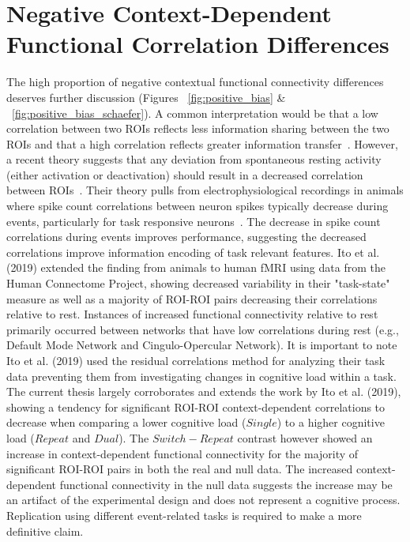 \documentclass[phd,figures,tables,ackpage,abstractpage,publicabstractpage]{uithesis}
\begin{document}
\section{Negative Context-Dependent Functional Correlation Differences}

The high proportion of negative contextual functional connectivity differences deserves
further discussion (Figures ~\ref{fig:positive_bias} \& ~\ref{fig:positive_bias_schaefer}).
A common interpretation would be that a low correlation between two ROIs reflects less information
sharing between the two ROIs and that a high correlation
reflects greater information transfer~\cite{Gonzalez-Castillo2018}.
However, a recent theory suggests that any deviation from spontaneous resting activity
(either activation or deactivation) should result in a decreased correlation between ROIs~\cite{Ito2019}.
Their theory pulls from electrophysiological recordings in animals where
spike count correlations between neuron spikes typically decrease during events,
particularly for task responsive neurons~\cite{Ruff2014,Cohen2009}.
The decrease in spike count correlations during events improves performance,
suggesting the decreased correlations improve information encoding of task
relevant features.
Ito et al. (2019) extended the finding from animals to human fMRI
using data from the Human Connectome Project, showing decreased variability
in their "task-state" measure as well as a majority of ROI-ROI pairs decreasing their
correlations relative to rest.
Instances of increased functional connectivity relative to rest primarily occurred between
networks that have low correlations during rest (e.g., Default Mode Network and Cingulo-Opercular Network).
It is important to note Ito et al. (2019) used the residual correlations method for analyzing
their task data preventing them from investigating changes in cognitive load within a task.
The current thesis largely corroborates and extends the work by Ito et al. (2019),
showing a tendency for significant ROI-ROI context-dependent correlations to decrease
when comparing a lower cognitive load ($Single$) to a higher cognitive load ($Repeat$ and $Dual$).
The $Switch - Repeat$ contrast however showed an increase in context-dependent functional connectivity
for the majority of significant ROI-ROI pairs in both the real and null data.
The increased context-dependent functional connectivity in the null data suggests
the increase may be an artifact of the experimental design and does not represent
a cognitive process.
Replication using different event-related tasks is required to make a more definitive
claim.
\end{document}
